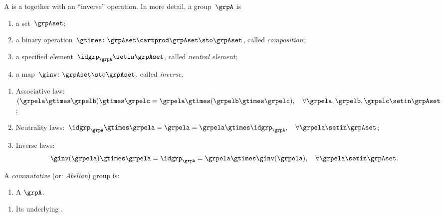 \begin{ctdefinition}[Group]
    \label{def:group}
    A  is a  together with an ``inverse'' operation.
    In more detail, a group~$\grpA$ is
    \begin{body}
        \constit
        \begin{enumerate}
            \item a set~$\grpAset$;
            \item a binary operation~$\gtimes \colon \grpAset \cartprod \grpAset \sto \grpAset$, called \emph{composition};
            \item a specified element~$\idgrp_\grpA \setin \grpAset$, called \emph{neutral element};
            \item a map~$\ginv\colon \grpAset \sto \grpAset$, called \emph{inverse}.
        \end{enumerate}
        \condit
        \begin{enumerate}
            \item Associative law:~$(\grpela\gtimes \grpelb)\gtimes \grpelc=\grpela\gtimes (\grpelb\gtimes \grpelc), \quad \forall  \grpela, \grpelb, \grpelc \setin \grpAset$;
            \item Neutrality laws:~$\idgrp_\grpA \gtimes \grpela=\grpela=\grpela \gtimes \idgrp_\grpA, \quad \forall  \grpela \setin \grpAset$;
            \item Inverse laws:
                  \begin{equation}
                      \label{eq:group-inverse-law}
                      \ginv(\grpela) \gtimes \grpela = \idgrp_\grpA = \grpela \gtimes \ginv(\grpela), \quad \forall  \grpela  \setin \grpAset.
                  \end{equation}
        \end{enumerate}
    \end{body}
\end{ctdefinition}

\begin{marginfigure}
    \centering
    \caption{Group Diagram}
    \label{fig:group-diagram}
\end{marginfigure}


\begin{ctdefinition}\label{def:commutative-group}
    A \emph{commutative} (or: \emph{Abelian}) group is:

    \constit
    \begin{enumerate}
        \item A  $\grpA$.
    \end{enumerate}

    \condit
    \begin{enumerate}
        \item Its underlying .
    \end{enumerate}
\end{ctdefinition}


